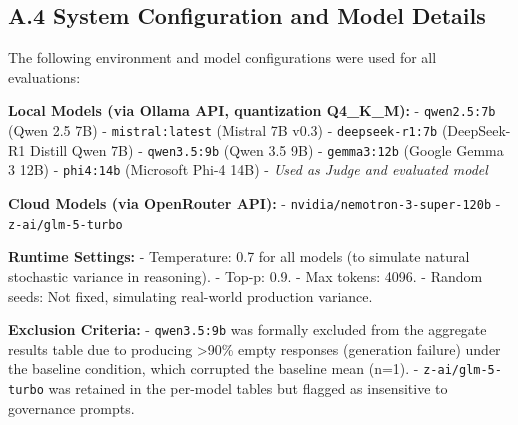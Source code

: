 \documentclass[11pt,a4paper]{article}
\begin{document}
{\small\begin{Shaded}
\begin{Highlighting}[]



\end{Highlighting}
\end{Shaded}}

\subsection{A.4 System Configuration and Model
Details}\label{a.4-system-configuration-and-model-details}

The following environment and model configurations were used for all
evaluations:

\textbf{Local Models (via Ollama API, quantization Q4\_K\_M):} -
\texttt{qwen2.5:7b} (Qwen 2.5 7B) - \texttt{mistral:latest} (Mistral 7B
v0.3) - \texttt{deepseek-r1:7b} (DeepSeek-R1 Distill Qwen 7B) -
\texttt{qwen3.5:9b} (Qwen 3.5 9B) - \texttt{gemma3:12b} (Google Gemma 3
12B) - \texttt{phi4:14b} (Microsoft Phi-4 14B) - \emph{Used as Judge and
evaluated model}

\textbf{Cloud Models (via OpenRouter API):} -
\texttt{nvidia/nemotron-3-super-120b} - \texttt{z-ai/glm-5-turbo}

\textbf{Runtime Settings:} - Temperature: 0.7 for all models (to
simulate natural stochastic variance in reasoning). - Top-p: 0.9. - Max
tokens: 4096. - Random seeds: Not fixed, simulating real-world
production variance.

\textbf{Exclusion Criteria:} - \texttt{qwen3.5:9b} was formally excluded
from the aggregate results table due to producing \textgreater90\% empty
responses (generation failure) under the baseline condition, which
corrupted the baseline mean (n=1). - \texttt{z-ai/glm-5-turbo} was
retained in the per-model tables but flagged as insensitive to
governance prompts.
\end{document}

